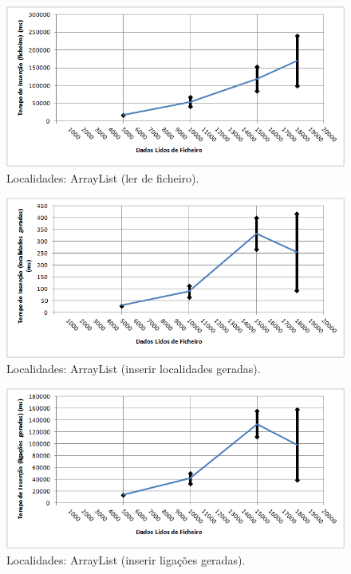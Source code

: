 \documentclass[a5paper,twocolumn, 11pt]{article}
\begin{document}
\begin{figure}[h!b!t!]
    \caption[Localidades: ArrayList (ler de ficheiro)]{Localidades: ArrayList (ler de ficheiro).}
    \label{hashtable}
    \centering
        \includegraphics[width=400pt]{cloc_conf1_o1.png}
\end{figure}
\begin{figure}[h!b!t!]
    \caption[Localidades: ArrayList (inserir localidades geradas)]{Localidades: ArrayList (inserir localidades geradas).}
    \label{hashtable}
    \centering
        \includegraphics[width=400pt]{cloc_conf1_o2.png}
\end{figure}
\begin{figure}[h!b!t!]
    \caption[Localidades: ArrayList (inserir ligações geradas)]{Localidades: ArrayList (inserir ligações geradas).}
    \label{hashtable}
    \centering
        \includegraphics[width=400pt]{cloc_conf1_o3.png}
\end{figure}
\end{document}
